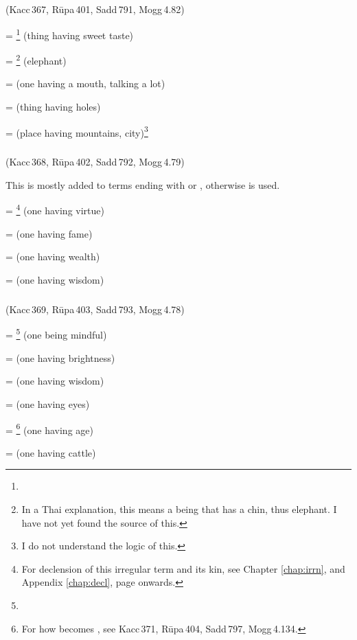 \subparagraph*{} (Kacc\,367, R\=upa\,401, Sadd\,791, Mogg\,4.82)\label{pacct10:ra}

 = \footnote{} (thing having sweet taste) \par
{} = \footnote{In a Thai explanation, this means a being that has a chin, thus elephant. I have not yet found the source of this.} (elephant) \par
{} =  (one having a mouth, talking a lot) \par
{} =  (thing having holes) \par
{} =  (place having mountains, city)\footnote{I do not understand the logic of this.} \par

\subparagraph*{} (Kacc\,368, R\=upa\,402, Sadd\,792, Mogg\,4.79)\label{pacct10:vantu}

This  is mostly added to terms ending with  or , otherwise  is used.

 = \footnote{ For declension of this irregular term and its kin, see Chapter \ref{chap:irrn}, and Appendix \ref{chap:decl}, page \pageref{decl:gunavm} onwards.} (one having virtue) \par
{} =  (one having fame) \par
{} =  (one having wealth) \par
{} =  (one having wisdom) \par

\subparagraph*{} (Kacc\,369, R\=upa\,403, Sadd\,793, Mogg\,4.78)\label{pacct10:mantu}

 = \footnote{} (one being mindful) \par
{} =  (one having brightness) \par
{} =  (one having wisdom) \par
{} =  (one having eyes) \par
{} = \footnote{ For how  becomes , see Kacc\,371, R\=upa\,404, Sadd\,797, Mogg\,4.134.} (one having age) \par
{} =  (one having cattle) \par

